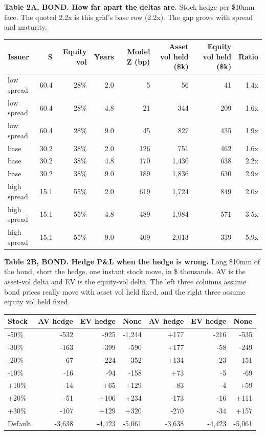 \documentclass[10pt,a4paper]{article}
\begin{document}
\textbf{Table 2A, BOND. How far apart the deltas are.} Stock hedge per \$10mm face. The quoted 2.2x is this grid's base row (2.2x). The gap grows with spread and maturity.
{\small
\begin{center}\begin{tabular}{lrrrrrrr}\toprule
Issuer & S & Equity vol & Years & Model Z (bp) & Asset vol held (\$k) & Equity vol held (\$k) & Ratio \\ \midrule
low spread & 60.4 & 28\% & 2.0 & 5 & 56 & 41 & 1.4x \\
low spread & 60.4 & 28\% & 4.8 & 21 & 344 & 209 & 1.6x \\
low spread & 60.4 & 28\% & 9.0 & 45 & 827 & 435 & 1.9x \\
base & 30.2 & 38\% & 2.0 & 126 & 751 & 462 & 1.6x \\
base & 30.2 & 38\% & 4.8 & 170 & 1,430 & 638 & 2.2x \\
base & 30.2 & 38\% & 9.0 & 189 & 1,836 & 630 & 2.9x \\
high spread & 15.1 & 55\% & 2.0 & 619 & 1,724 & 849 & 2.0x \\
high spread & 15.1 & 55\% & 4.8 & 489 & 1,984 & 571 & 3.5x \\
high spread & 15.1 & 55\% & 9.0 & 409 & 2,013 & 339 & 5.9x \\
\bottomrule\end{tabular}\end{center}}


\textbf{Table 2B, BOND. Hedge P\&L when the hedge is wrong.} Long \$10mm of the bond, short the hedge, one instant stock move, in \$ thousands. AV is the asset-vol delta and EV is the equity-vol delta. The left three columns assume bond prices really move with asset vol held fixed, and the right three assume equity vol held fixed.
{\small
\begin{center}\begin{tabular}{lrrrrrr}\toprule
Stock & AV hedge & EV hedge & None & AV hedge & EV hedge & None \\ \midrule
-50\% & -532 & -925 & -1,244 & +177 & -216 & -535 \\
-30\% & -163 & -399 & -590 & +177 & -58 & -249 \\
-20\% & -67 & -224 & -352 & +134 & -23 & -151 \\
-10\% & -16 & -94 & -158 & +73 & -5 & -69 \\
+10\% & -14 & +65 & +129 & -83 & -4 & +59 \\
+20\% & -51 & +106 & +234 & -173 & -16 & +111 \\
+30\% & -107 & +129 & +320 & -270 & -34 & +157 \\
Default & -3,638 & -4,423 & -5,061 & -3,638 & -4,423 & -5,061 \\
\bottomrule\end{tabular}\end{center}}
\end{document}
